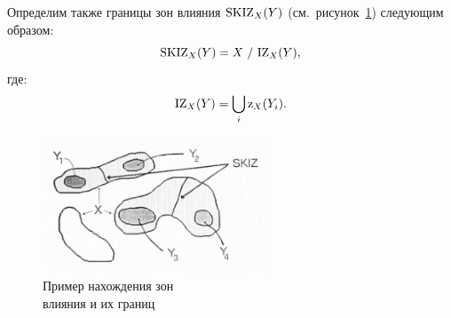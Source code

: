 \documentclass[14pt, a4paper]{extreport}
\begin{document}
 	Определим также границы зон влияния $\textup{SKIZ}_X(Y)$ (см.~рисунок~\ref{fig:SKIZ}) следующим образом:
 	 \begin{equation*}
 		\textup{SKIZ}_X(Y) = X~/~\textup{IZ}_X(Y),
 		\label{SKIZ_X(Y)}
 	\end{equation*}
	где:
	\begin{equation*}
		\textup{IZ}_X(Y) = \bigcup_{i} \textup{z}_X(Y_i).
		\label{IZ_X(Y)}
	\end{equation*}

	\begin{figure}[h!]
		\centering
		\includegraphics[width = 0.6\textwidth]{image/chapter_2/SKIZ}	
		\caption{Пример нахождения зон \\влияния и их границ}
		\label{fig:SKIZ}
	\end{figure}
	
\end{document}
